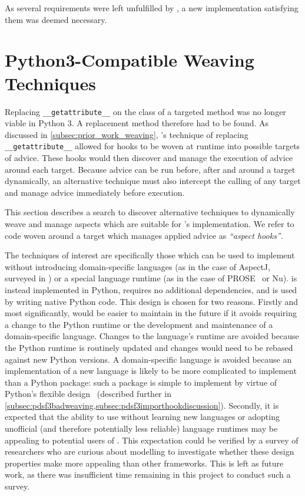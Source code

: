 As several requirements were left unfulfilled by
\pydysofu{}, a new implementation satisfying them was deemed necessary.


\section{Python3-Compatible Weaving Techniques}\label{sec:pdsf3python3}

Replacing \lstinline{__getattribute__} on the class of a targeted method was no
longer viable in Python 3. A replacement method therefore had to be found. As
discussed in \cref{subsec:prior_work_weaving}, \pydysofu{}'s technique of
replacing \lstinline{__getattribute__} allowed for hooks to be woven at runtime
into possible targets of advice. These hooks would then discover and manage the
execution of advice around each target. Because advice can be run before, after
and around a target dynamically, an alternative technique must also intercept
the calling of any target and manage advice immediately before execution. 

This section describes a search to discover alternative techniques to
dynamically weave and manage aspects which are suitable for \pdsfthree{}'s
implementation. We refer to code woven around a target which manages applied
advice as \emph{``aspect hooks''}.

The techniques of interest are specifically those which can be used to implement
\aop{} without introducing domain-specific languages (as in the case of AspectJ,
surveyed in \cite{AspectJLanguageAndTools,aspectj_intro}) or a special language
runtime (as in the case of PROSE~\cite{popovici2002PROSE} or
Nu\cite{rajan2006nu_towardsao_invocation}). \pdsfthree{} is instead implemented
in Python, requires no additional dependencies, and is used by writing native
Python code. This design is chosen for two reasons. Firstly and most
significantly, \pdsfthree would be easier to maintain in the future if it avoids
requiring a change to the Python runtime or the development and maintenance of a
domain-specific language. Changes to the language's runtime are avoided because
the Python runtime is routinely updated and changes would need to be rebased
against new Python versions. A domain-specific language is avoided because an
implementation of a new language is likely to be more complicated to implement
than a Python package: such a package is simple to implement by virtue of
Python's flexible
design~\cite{advanced_python_monkey_patching,forbiddenfruit_repo}
(described further in
\cref{subsec:pdsf3badweaving,subsec:pdsf3importhookdiscussion}). Secondly, it is
expected that the ability to use \pdsfthree{} without learning new languages or
adopting unofficial (and therefore potentially less reliable) language runtimes
may be appealing to potential users of \aop{}. This expectation could be
verified by a survey of researchers who are curious about \aspectoriented{}
modelling to investigate whether these design properties make \pdsfthree{} more
appealing than other \aop{} frameworks. This is left as future work, as there
was insufficient time remaining in this project to conduct such a survey.


